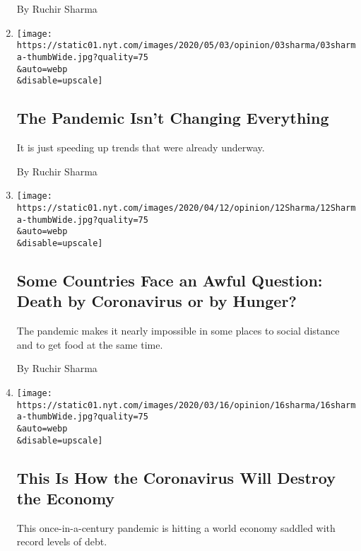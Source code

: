 \begin{enumerate}
  By Ruchir Sharma
\item
  \href{/2020/05/03/opinion/coronavirus-economy-nationalism.html}{}

  \texttt{[image: https://static01.nyt.com/images/2020/05/03/opinion/03sharma/03sharma-thumbWide.jpg?quality=75\\\&auto=webp\\\&disable=upscale]}

  \hypertarget{the-pandemic-isnt-changing-everything}{%
  \subsection{The Pandemic Isn't Changing
  Everything}\label{the-pandemic-isnt-changing-everything}}

  It is just speeding up trends that were already underway.

  By Ruchir Sharma
\item
  \href{/2020/04/12/opinion/coronavirus-poverty.html}{}

  \texttt{[image: https://static01.nyt.com/images/2020/04/12/opinion/12Sharma/12Sharma-thumbWide.jpg?quality=75\\\&auto=webp\\\&disable=upscale]}

  \hypertarget{some-countries-face-an-awful-question-death-by-coronavirus-or-by-hunger}{%
  \subsection{Some Countries Face an Awful Question: Death by
  Coronavirus or by
  Hunger?}\label{some-countries-face-an-awful-question-death-by-coronavirus-or-by-hunger}}

  The pandemic makes it nearly impossible in some places to social
  distance and to get food at the same time.

  By Ruchir Sharma
\item
  \href{/2020/03/16/opinion/coronavirus-economy-debt.html}{}

  \texttt{[image: https://static01.nyt.com/images/2020/03/16/opinion/16sharma/16sharma-thumbWide.jpg?quality=75\\\&auto=webp\\\&disable=upscale]}

  \hypertarget{this-is-how-the-coronavirus-will-destroy-the-economy}{%
  \subsection{This Is How the Coronavirus Will Destroy the
  Economy}\label{this-is-how-the-coronavirus-will-destroy-the-economy}}

  This once-in-a-century pandemic is hitting a world economy saddled
  with record levels of debt.


\end{enumerate}
